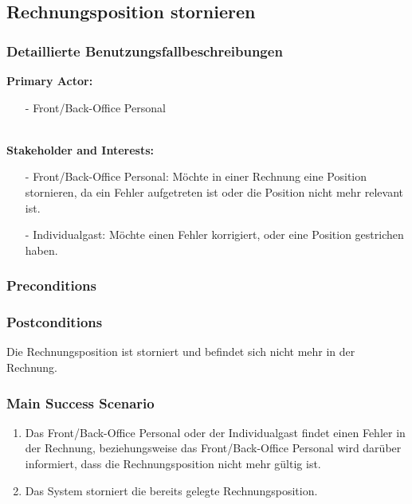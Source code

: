 \documentclass[./detailed_overview_usecases.tex]{subfiles}
\begin{document}
    \subsection{Rechnungsposition stornieren}
    \subsubsection{Detaillierte Benutzungsfallbeschreibungen}
    \textbf{Primary Actor: }
    \begin{itemize}
        \item [-] Front/Back-Office Personal
    \end{itemize}
    \\
    \textbf{Stakeholder and Interests:}
    \begin{itemize}
        \item[-] Front/Back-Office Personal: Möchte in einer Rechnung eine Position stornieren, da ein Fehler aufgetreten ist oder die Position nicht mehr relevant ist.
        \item[-] Individualgast: Möchte einen Fehler korrigiert, oder eine Position gestrichen haben.
    \end{itemize}

    \subsubsection*{Preconditions}

    \subsubsection*{Postconditions}
    Die Rechnungsposition ist storniert und befindet sich nicht mehr in der Rechnung.

    \subsubsection*{Main Success Scenario}
    \begin{enumerate}
        \item Das Front/Back-Office Personal oder der Individualgast findet einen Fehler in der Rechnung, beziehungsweise das Front/Back-Office Personal wird darüber informiert, dass die Rechnungsposition nicht mehr gültig ist.
        \item Das System storniert die bereits gelegte Rechnungsposition.
    \end{enumerate}
\end{document}

